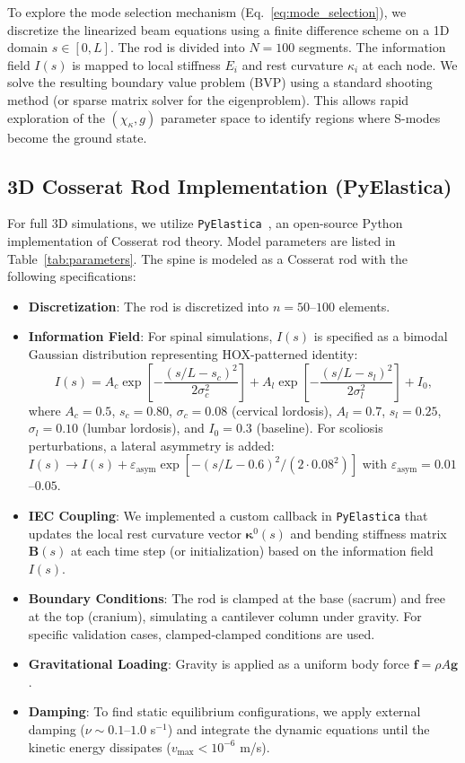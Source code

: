 \documentclass[11pt,a4paper]{article}
\begin{document}
To explore the mode selection mechanism (Eq.~\ref{eq:mode_selection}), we discretize the linearized beam equations using a finite difference scheme on a 1D domain $s \in [0, L]$. The rod is divided into $N=100$ segments. The information field $I(s)$ is mapped to local stiffness $E_i$ and rest curvature $\kappa_{i}$ at each node. We solve the resulting boundary value problem (BVP) using a standard shooting method (or sparse matrix solver for the eigenproblem). This allows rapid exploration of the $(\chi_\kappa, g)$ parameter space to identify regions where S-modes become the ground state.

\subsection{3D Cosserat Rod Implementation (PyElastica)}

For full 3D simulations, we utilize \texttt{PyElastica}~\cite{pyelastica_zenodo,gazzola2018forward}, an open-source Python implementation of Cosserat rod theory. Model parameters are listed in Table~\ref{tab:parameters}. The spine is modeled as a Cosserat rod with the following specifications:

\begin{itemize}
    \item \textbf{Discretization}: The rod is discretized into $n=50$--$100$ elements.
    \item \textbf{Information Field}: For spinal simulations, $I(s)$ is specified as a bimodal Gaussian distribution representing HOX-patterned identity:
    \begin{equation}
    I(s) = A_c \exp\left[-\frac{(s/L - s_c)^2}{2\sigma_c^2}\right] + A_l \exp\left[-\frac{(s/L - s_l)^2}{2\sigma_l^2}\right] + I_0,
    \label{eq:info_field_spinal}
    \end{equation}
    where $A_c = 0.5$, $s_c = 0.80$, $\sigma_c = 0.08$ (cervical lordosis), $A_l = 0.7$, $s_l = 0.25$, $\sigma_l = 0.10$ (lumbar lordosis), and $I_0 = 0.3$ (baseline). For scoliosis perturbations, a lateral asymmetry is added: $I(s) \to I(s) + \varepsilon_{\mathrm{asym}} \exp[-(s/L - 0.6)^2/(2 \cdot 0.08^2)]$ with $\varepsilon_{\mathrm{asym}} = 0.01$--$0.05$.
    \item \textbf{IEC Coupling}: We implemented a custom callback in \texttt{PyElastica} that updates the local rest curvature vector $\bm{\kappa}^0(s)$ and bending stiffness matrix $\mathbf{B}(s)$ at each time step (or initialization) based on the information field $I(s)$.
    \item \textbf{Boundary Conditions}: The rod is clamped at the base (sacrum) and free at the top (cranium), simulating a cantilever column under gravity. For specific validation cases, clamped-clamped conditions are used.
    \item \textbf{Gravitational Loading}: Gravity is applied as a uniform body force $\mathbf{f} = \rho A \mathbf{g}$.
    \item \textbf{Damping}: To find static equilibrium configurations, we apply external damping ($\nu \sim 0.1$--$1.0$ s$^{-1}$) and integrate the dynamic equations until the kinetic energy dissipates ($v_{\max} < 10^{-6}$ m/s).
\end{itemize}
\end{document}
